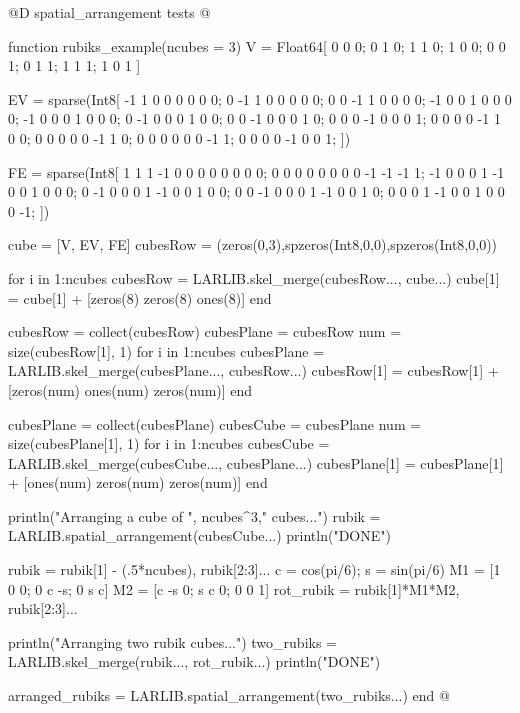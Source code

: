 @D spatial\_arrangement tests
@{function rubiks_example(ncubes = 3)
    V = Float64[
        0 0 0; 0 1 0;
        1 1 0; 1 0 0;
        0 0 1; 0 1 1;
        1 1 1; 1 0 1
    ]

    EV = sparse(Int8[
        -1  1  0  0  0  0  0  0;
        0 -1  1  0  0  0  0  0;
        0  0 -1  1  0  0  0  0;
        -1  0  0  1  0  0  0  0;
        -1  0  0  0  1  0  0  0;
        0 -1  0  0  0  1  0  0;
        0  0 -1  0  0  0  1  0;
        0  0  0 -1  0  0  0  1;
        0  0  0  0 -1  1  0  0;
        0  0  0  0  0 -1  1  0;
        0  0  0  0  0  0 -1  1;
        0  0  0  0 -1  0  0  1;
    ])

    FE = sparse(Int8[
        1  1  1 -1  0  0  0  0  0  0  0  0;
        0  0  0  0  0  0  0  0 -1 -1 -1  1;
        -1  0  0  0  1 -1  0  0  1  0  0  0;
        0 -1  0  0  0  1 -1  0  0  1  0  0;
        0  0 -1  0  0  0  1 -1  0  0  1  0;
        0  0  0  1 -1  0  0  1  0  0  0 -1;
    ])

    cube = [V, EV, FE]
    cubesRow = (zeros(0,3),spzeros(Int8,0,0),spzeros(Int8,0,0))

    for i in 1:ncubes
        cubesRow = LARLIB.skel_merge(cubesRow..., cube...)
        cube[1] = cube[1] + [zeros(8) zeros(8) ones(8)]
    end

    cubesRow = collect(cubesRow)
    cubesPlane = cubesRow
    num = size(cubesRow[1], 1)
    for i in 1:ncubes
        cubesPlane = LARLIB.skel_merge(cubesPlane..., cubesRow...)
        cubesRow[1] = cubesRow[1] + [zeros(num) ones(num) zeros(num)]
    end

    cubesPlane = collect(cubesPlane)
    cubesCube = cubesPlane
    num = size(cubesPlane[1], 1)
    for i in 1:ncubes
        cubesCube = LARLIB.skel_merge(cubesCube..., cubesPlane...)
        cubesPlane[1] = cubesPlane[1] + [ones(num) zeros(num) zeros(num)]
    end

    println("Arranging a cube of ", ncubes^3," cubes...")
    rubik = LARLIB.spatial_arrangement(cubesCube...)
    println("DONE")

    rubik = rubik[1] - (.5*ncubes), rubik[2:3]...
    c = cos(pi/6); s = sin(pi/6)
    M1 = [1  0 0; 0 c -s; 0 s c]
    M2 = [c -s 0; s c  0; 0 0 1]
    rot_rubik = rubik[1]*M1*M2, rubik[2:3]...

    println("Arranging two rubik cubes...")
    two_rubiks = LARLIB.skel_merge(rubik..., rot_rubik...)
    println("DONE")

    arranged_rubiks = LARLIB.spatial_arrangement(two_rubiks...)
end
@}

